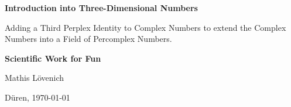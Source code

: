 
\begin{titlepage}
	\thispagestyle{empty}
    \begin{center}
        \vspace*{1cm}
            
        \Huge
        \textbf{Introduction into Three-Dimensional Numbers}
            
        \vspace{0.5cm}
        \LARGE
        Adding a Third Perplex Identity to Complex Numbers to
        extend the Complex Numbers into a Field of Percomplex Numbers.
            
        \vspace{1cm}
            
       \textbf{Scientific Work for Fun}
       
       \smaller
        Mathis Lövenich\\
        
        
        \vspace{2cm}
        \begin{minipage}[b]{7cm}
			\centering
			Düren, \today\\
		\end{minipage}
            
    \end{center}
    \restoregeometry
	\end{titlepage}